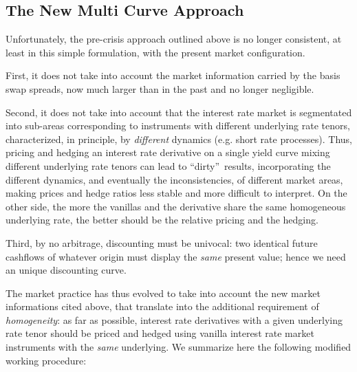 \documentclass[11pt,reqno]{amsart}
\begin{document}
\subsection{\label{SecMultiCurve}The New Multi Curve Approach}

Unfortunately, the pre-crisis approach outlined above is no longer consistent, at least in this simple formulation, with the present market configuration.

First, it does not take into account the market information carried by the basis swap spreads, now much larger than in the past and no longer negligible.

Second, it does not take into account that the interest rate market is segmentated into sub-areas corresponding to instruments with different underlying rate tenors, characterized, in principle, by \textit{different} dynamics (e.g. short rate processes). Thus, pricing and hedging an interest rate derivative on a single yield curve mixing different underlying rate tenors can lead to \textquotedblleft dirty\textquotedblright\ results, incorporating the different dynamics, and eventually the inconsistencies, of different market areas, making prices and hedge ratios less stable and more difficult to interpret. On the other side, the more the vanillas and the derivative share the same homogeneous underlying rate, the better should be the relative pricing and the hedging.

Third, by no arbitrage, discounting must be univocal: two identical future cashflows of whatever origin must display the \textit{same} present value; hence we need an unique discounting curve.

The market practice has thus evolved to take into account the new market informations cited above, that translate into the additional requirement of \textit{homogeneity}: as far as possible, interest rate derivatives with a given underlying rate tenor should be priced and hedged using vanilla interest rate market instruments with the \textit{same} underlying. We summarize here the following modified working procedure:
\end{document}
